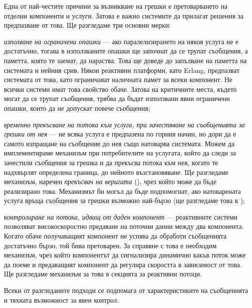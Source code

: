 Една от най-честите причини за възникване на грешки е претоварването на отделни компоненти и услуги. Затова е важно системите да прилагат решения за предпазване от това. Ще разгледаме три основни мерки:

\begin{itemize*}
  \item \emph{изполване на ограничени опашки} — ако паралелизирането на някоя услуга не е достатъчно, тогава в използваните опашки ще започнат да се трупат съобщения, а паметта, която те заемат, да нараства. Това ще доведе до запълване на паметта на системата и нейния срив. Някои реактивни платформи, като Erlang, предпазват системата от това, като ограничават наличната памет за всеки компонент. Не всички системи имат това свойство обаче. Затова на критичните места, където могат да се трупат съобщения, трябва да бъдат използвани явни ограничени опашки, които да не допускат повече съобщения;
  \item \emph{временно прекъсване на потока към услуга, при зачестяване на съобщенията за грешки от нея} — не всяка услуга е предпазена по горния начин, но дори да е самото изпращане на съобщение до нея също натоварва системата. Можем да имплементираме механизъм при потребителите на услугата, който да следи за зачестили съобщения за грешка и да прекъсва потока към нея, когато те надхвърлят определена граница, до нейното възстановяване. Ще разгледаме механизъм, наречен \emph{прекъсвач на веригата} (), чрез който може да бъде реализирано това. Механизмът би могъл да бъде подпомогнат, ако натоварената услуга връща съобщения за грешки възможно най-бързо (ще разгледаме това в );
  \item \emph{контролиране на потока, идващ от даден компонент} — реактивните системи позволяват високоскоростно предаване на поточни данни между два компонента. Когато обаче получаващият компонент не успява да обработи съобщенията достатъчно бързо, той бива претоварен. За справяне с това е необходим механизъм, чрез който компонентът да сигнализира динамично какъв поток може да поеме и предаващият компонент да регулира скоростта в зависимост от това. Ще разгледаме механизъм за това в секцията за реактивни потоци.
\end{itemize*}

Всеки от разгледаните подходи се подпомага от характеристиките на съобщенията и тяхната възможност за явен контрол.

